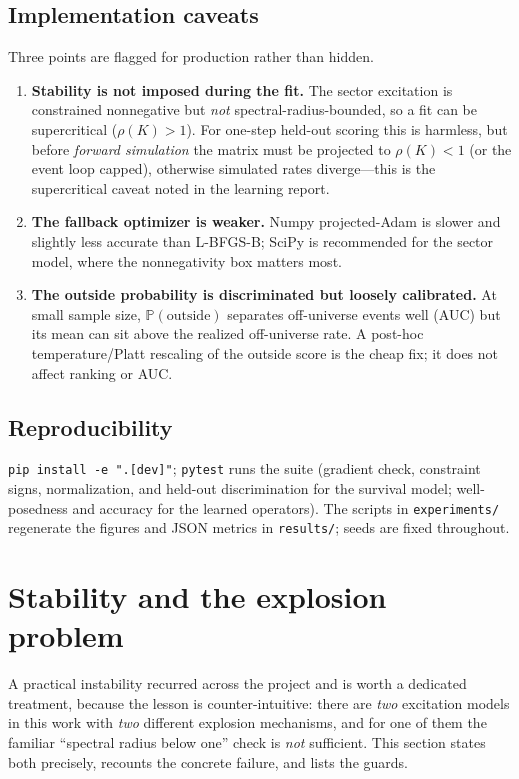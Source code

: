 \documentclass[11pt]{article}
\theoremstyle{plain}
\theoremstyle{definition}
\theoremstyle{remark}
\newcommand{\Prob}{\mathbb{P}}
\newcommand{\code}[1]{\texttt{#1}}
\begin{document}
\subsection{Implementation caveats}
Three points are flagged for production rather than hidden.
\begin{enumerate}[leftmargin=1.5em,itemsep=2pt]
\item \textbf{Stability is not imposed during the fit.} The sector excitation is constrained nonnegative but \emph{not} spectral-radius-bounded, so a fit can be supercritical ($\rho(K)>1$). For one-step held-out scoring this is harmless, but before \emph{forward simulation} the matrix must be projected to $\rho(K)<1$ (or the event loop capped), otherwise simulated rates diverge---this is the supercritical caveat noted in the learning report.
\item \textbf{The fallback optimizer is weaker.} Numpy projected-Adam is slower and slightly less accurate than L-BFGS-B; SciPy is recommended for the sector model, where the nonnegativity box matters most.
\item \textbf{The outside probability is discriminated but loosely calibrated.} At small sample size, $\Prob(\text{outside})$ separates off-universe events well (AUC) but its mean can sit above the realized off-universe rate. A post-hoc temperature/Platt rescaling of the outside score is the cheap fix; it does not affect ranking or AUC.
\end{enumerate}

\subsection{Reproducibility}
\code{pip install -e ".[dev]"}; \code{pytest} runs the suite (gradient check, constraint signs, normalization, and held-out discrimination for the survival model; well-posedness and accuracy for the learned operators). The scripts in \code{experiments/} regenerate the figures and JSON metrics in \code{results/}; seeds are fixed throughout.

\section{Stability and the explosion problem}
\label{sec:stability}

A practical instability recurred across the project and is worth a dedicated treatment, because the lesson is counter-intuitive: there are \emph{two} excitation models in this work with \emph{two} different explosion mechanisms, and for one of them the familiar ``spectral radius below one'' check is \emph{not} sufficient. This section states both precisely, recounts the concrete failure, and lists the guards.
\end{document}
